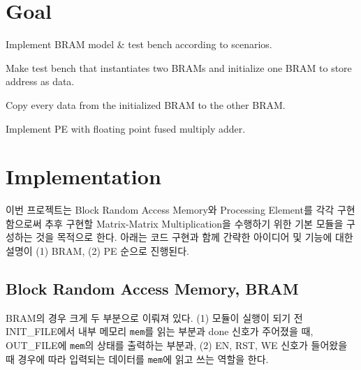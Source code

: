 \documentclass{article}
\begin{document}
\pagestyle{fancy}

\section*{Goal}

\begin{itemize*}
\item Implement BRAM model \& test bench according to scenarios.
\begin{itemize*}
\item Make test bench that instantiates two BRAMs and initialize one BRAM to store address as data.
\item Copy every data from the initialized BRAM to the other BRAM.
\end{itemize*}
\item Implement PE with floating point fused multiply adder.
\end{itemize*}

\section{Implementation}

이번 프로젝트는 Block Random Access Memory와 Processing Element를 각각 구현함으로써 추후 구현할 Matrix-Matrix Multiplication을 수행하기 위한 기본 모듈을 구성하는 것을 목적으로 한다. 아래는 코드 구현과 함께 간략한 아이디어 및 기능에 대한 설명이 (1) BRAM, (2) PE 순으로 진행된다.

\subsection{Block Random Access Memory, BRAM}
BRAM의 경우 크게 두 부분으로 이뤄져 있다. (1) 모듈이 실행이 되기 전 INIT\_FILE에서 내부 메모리 \texttt{mem}를 읽는 부분과 done 신호가 주어졌을 때, OUT\_FILE에 \texttt{mem}의 상태를 출력하는 부분과, (2) EN, RST, WE 신호가 들어왔을 때 경우에 따라 입력되는 데이터를 \texttt{mem}에 읽고 쓰는 역할을 한다.
\end{document}
